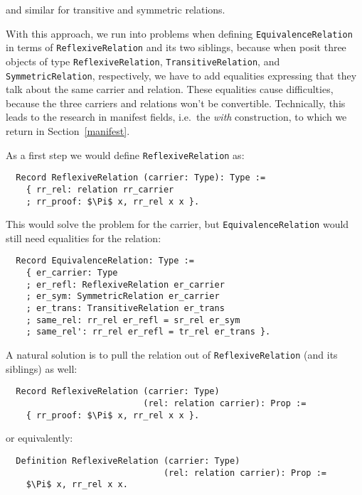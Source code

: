 \documentclass[a4paper,10pt,runningheads]{llncs}
\begin{document}
and similar for transitive and symmetric relations.

With this approach, we run into problems when defining \lstinline|EquivalenceRelation| in terms of
\lstinline|ReflexiveRelation| and its two siblings, because when posit three objects of type
\lstinline|ReflexiveRelation|, \lstinline|TransitiveRelation|, and \lstinline|SymmetricRelation|, respectively, we have to
add equalities expressing that they talk about the same carrier and relation. These equalities
cause difficulties, because the three carriers and relations won't be convertible.
Technically, this leads to the research in manifest fields, i.e.\ the \emph{with} construction, to
which we return in Section~\ref{manifest}.

As a first step we would define \lstinline|ReflexiveRelation| as:
\begin{lstlisting}
  Record ReflexiveRelation (carrier: Type): Type :=
    { rr_rel: relation rr_carrier
    ; rr_proof: $\Pi$ x, rr_rel x x }.
\end{lstlisting}

This would solve the problem for the carrier, but \lstinline|EquivalenceRelation| would still need equalities for the relation:
\begin{lstlisting}
  Record EquivalenceRelation: Type :=
    { er_carrier: Type
    ; er_refl: ReflexiveRelation er_carrier
    ; er_sym: SymmetricRelation er_carrier
    ; er_trans: TransitiveRelation er_trans
    ; same_rel: rr_rel er_refl = sr_rel er_sym
    ; same_rel': rr_rel er_refl = tr_rel er_trans }.
\end{lstlisting}


A natural solution is to pull the relation out of \lstinline|ReflexiveRelation| (and its siblings) as well:
\begin{lstlisting}
  Record ReflexiveRelation (carrier: Type)
                           (rel: relation carrier): Prop :=
    { rr_proof: $\Pi$ x, rr_rel x x }.
\end{lstlisting}

or equivalently:
\begin{lstlisting}
  Definition ReflexiveRelation (carrier: Type)
                               (rel: relation carrier): Prop :=
    $\Pi$ x, rr_rel x x.
\end{lstlisting}
\end{document}
